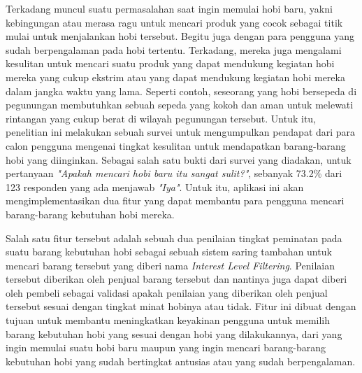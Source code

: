 \documentclass[a4paper]{article}
\begin{document}
Terkadang muncul suatu permasalahan saat ingin memulai hobi baru, yakni kebingungan atau merasa ragu untuk mencari produk yang cocok sebagai titik mulai untuk menjalankan hobi tersebut. Begitu juga dengan para pengguna yang sudah berpengalaman pada hobi tertentu. Terkadang, mereka juga mengalami kesulitan untuk mencari suatu produk yang dapat mendukung kegiatan hobi mereka yang cukup ekstrim atau yang dapat mendukung kegiatan hobi mereka dalam jangka waktu yang lama. Seperti contoh, seseorang yang hobi bersepeda di pegunungan membutuhkan sebuah sepeda yang kokoh dan aman untuk melewati rintangan yang cukup berat di wilayah pegunungan tersebut. Untuk itu, penelitian ini melakukan sebuah survei untuk mengumpulkan pendapat dari para calon pengguna mengenai tingkat kesulitan untuk mendapatkan barang-barang hobi yang diinginkan. Sebagai salah satu bukti dari survei yang diadakan, untuk pertanyaan \textit{"Apakah mencari hobi baru itu sangat sulit?"}, sebanyak 73.2\% dari 123 responden yang ada menjawab \textit{"Iya"}. Untuk itu, aplikasi ini akan mengimplementasikan dua fitur yang dapat membantu para pengguna mencari barang-barang kebutuhan hobi mereka.


Salah satu fitur tersebut adalah sebuah dua penilaian tingkat peminatan pada suatu barang kebutuhan hobi sebagai sebuah sistem saring tambahan untuk mencari barang tersebut yang diberi nama \textit{Interest Level Filtering}. Penilaian tersebut diberikan oleh penjual barang tersebut dan nantinya juga dapat diberi oleh pembeli sebagai validasi apakah penilaian yang diberikan oleh penjual tersebut sesuai dengan tingkat minat hobinya atau tidak. Fitur ini dibuat dengan tujuan untuk membantu meningkatkan keyakinan pengguna untuk memilih barang kebutuhan hobi yang sesuai dengan hobi yang dilakukannya, dari yang ingin memulai suatu hobi baru maupun yang ingin mencari barang-barang kebutuhan hobi yang sudah bertingkat antusias atau yang sudah berpengalaman.
\end{document}
